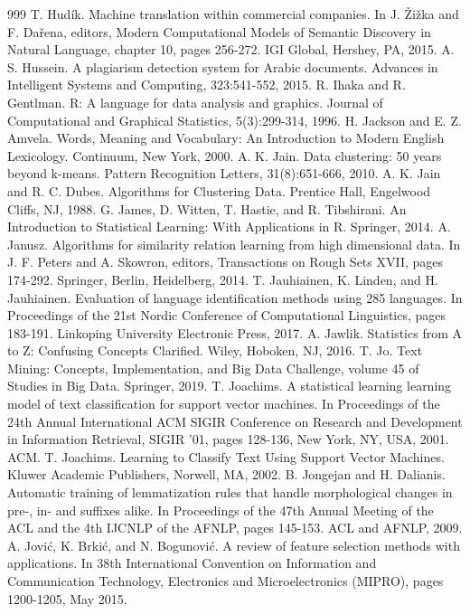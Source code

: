 \documentclass[11pt,openany,executivepaper]{book}
\begin{document}
\begin{thebibliography}{999}
 T. Hudík. Machine translation within commercial companies. In J. Žižka and F. Dařena, editors, Modern Computational Models of Semantic Discovery in Natural Language, chapter 10, pages 256-272. IGI Global, Hershey, PA, 2015.
 A. S. Hussein. A plagiarism detection system for Arabic documents. Advances in Intelligent Systems and Computing, 323:541-552, 2015.
 R. Ihaka and R. Gentlman. R: A language for data analysis and graphics. Journal of Computational and Graphical Statistics, 5(3):299-314, 1996.
 H. Jackson and E. Z. Amvela. Words, Meaning and Vocabulary: An Introduction to Modern English Lexicology. Continuum, New York, 2000.
 A. K. Jain. Data clustering: 50 years beyond k-means. Pattern Recognition Letters, 31(8):651-666, 2010.
 A. K. Jain and R. C. Dubes. Algorithms for Clustering Data. Prentice Hall, Engelwood Cliffs, NJ, 1988.
 G. James, D. Witten, T. Hastie, and R. Tibshirani. An Introduction to Statistical Learning: With Applications in R. Springer, 2014.
 A. Janusz. Algorithms for similarity relation learning from high dimensional data. In J. F. Peters and A. Skowron, editors, Transactions on Rough Sets XVII, pages 174-292. Springer, Berlin, Heidelberg, 2014.
 T. Jauhiainen, K. Linden, and H. Jauhiainen. Evaluation of language identification methods using 285 languages. In Proceedings of the 21st Nordic Conference of Computational Linguistics, pages 183-191. Linkoping University Electronic Press, 2017.
 A. Jawlik. Statistics from A to Z: Confusing Concepts Clarified. Wiley, Hoboken, NJ, 2016.
 T. Jo. Text Mining: Concepts, Implementation, and Big Data Challenge, volume 45 of Studies in Big Data. Springer, 2019.
 T. Joachims. A statistical learning learning model of text classification for support vector machines. In Proceedings of the 24th Annual International ACM SIGIR Conference on Research and Development in Information Retrieval, SIGIR '01, pages 128-136, New York, NY, USA, 2001. ACM.
 T. Joachims. Learning to Classify Text Using Support Vector Machines. Kluwer Academic Publishers, Norwell, MA, 2002.
 B. Jongejan and H. Dalianis. Automatic training of lemmatization rules that handle morphological changes in pre-, in- and suffixes alike. In Proceedings of the 47th Annual Meeting of the ACL and the 4th IJCNLP of the AFNLP, pages 145-153. ACL and AFNLP, 2009.
 A. Jović, K. Brkić, and N. Bogunović. A review of feature selection methods with applications. In 38th International Convention on Information and Communication Technology, Electronics and Microelectronics (MIPRO), pages 1200-1205, May 2015.

\end{thebibliography}
\end{document}
